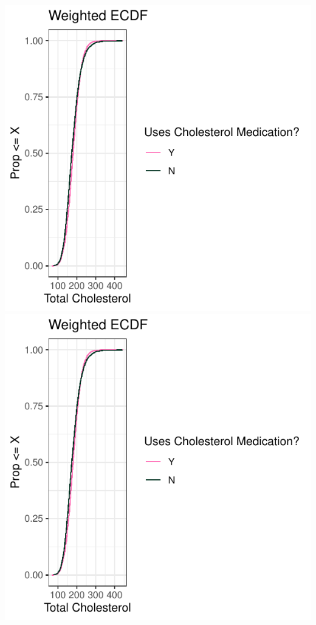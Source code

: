 \documentclass[useAMS,usenatbib,referee]{biom}
\begin{document}
\includegraphics{final-project_files/figure-latex/fig_ecdf-1.pdf}
\includegraphics{final-project_files/figure-latex/fig_ecdf-2.pdf}
\end{document}
